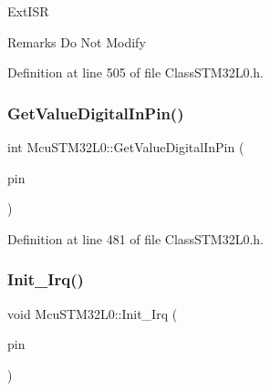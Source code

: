 Ext\+I\+SR \begin{DoxyRemark}{Remarks}
Do Not Modify 
\end{DoxyRemark}


Definition at line 505 of file Class\+S\+T\+M32\+L0.\+h.

\mbox{\label{class_mcu_s_t_m32_l0_ae390ee944052cf1d32fd5fb763921db8}} 
\subsubsection{\texorpdfstring{Get\+Value\+Digital\+In\+Pin()}{GetValueDigitalInPin()}}
{\footnotesize\ttfamily int Mcu\+S\+T\+M32\+L0\+::\+Get\+Value\+Digital\+In\+Pin (\begin{DoxyParamCaption}\item[{\mbox{\hyperlink{_class_s_t_m32_l0_8h_a5ceb873075d76667eb54dc6a7d2734d1}{Pin\+Name}}}]{pin }\end{DoxyParamCaption})\hspace{0.3cm}{\ttfamily [inline]}}



Definition at line 481 of file Class\+S\+T\+M32\+L0.\+h.

\mbox{\label{class_mcu_s_t_m32_l0_a950256ebfaebe49d311b95167ec00998}} 
\subsubsection{\texorpdfstring{Init\+\_\+\+Irq()}{Init\_Irq()}}
{\footnotesize\ttfamily void Mcu\+S\+T\+M32\+L0\+::\+Init\+\_\+\+Irq (\begin{DoxyParamCaption}\item[{\mbox{\hyperlink{_class_s_t_m32_l0_8h_a5ceb873075d76667eb54dc6a7d2734d1}{Pin\+Name}}}]{pin }\end{DoxyParamCaption})}

\mbox{\label{class_mcu_s_t_m32_l0_accd83e34546e9a8e5ad338a3ef5a39a3}} 
